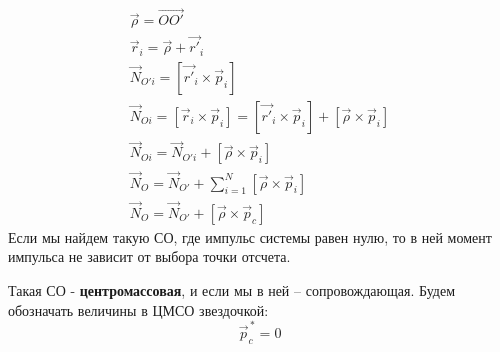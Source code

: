 \documentclass[a4paper,12pt]{extarticle}
\begin{document}
\begin{figure}[htbp]
	\centering
\end{figure}
\begin{gather}
	\vec\rho=\vec{OO'}\\
	\vec{r}_i=\vec\rho+\vec{r'}_i\\
	\vec{N}_{O'i}=[\vec{r'}_i\times\vec{p}_i]\\
	\vec{N}_{Oi}=[\vec{r}_i\times\vec{p}_i]=[\vec{r'}_i\times\vec{p}_i]+[\vec\rho\times\vec{p}_i]\\
	\vec{N}_{Oi}=\vec{N}_{O'i}+[\vec\rho\times\vec{p}_i]\\
	\vec{N}_{O}=\vec{N}_{O'}+\sum_{i=1}^{N}[\vec\rho\times\vec{p}_i]\\
	\vec{N}_{O}=\vec{N}_{O'}+[\vec\rho\times\vec{p}_c]
\end{gather}
Если мы найдем такую СО, где импульс системы равен нулю, то в ней момент импульса не зависит от выбора точки отсчета.

Такая СО - \textbf{центромассовая}, и если мы в ней -- сопровождающая.
Будем обозначать величины в ЦМСО звездочкой:
\begin{equation}
	\vec{p}_c^{\,*}=0
\end{equation}
\end{document}

